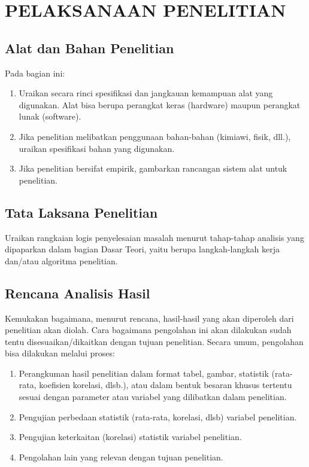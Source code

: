 \chapter{PELAKSANAAN PENELITIAN}
\label{pelaksanaan-penelitian}


\section{Alat dan Bahan Penelitian}


Pada bagian ini:
\begin{enumerate}[label=\alph*)]
\item Uraikan secara rinci spesifikasi dan jangkauan kemampuan alat yang digunakan. Alat
bisa berupa perangkat keras (hardware) maupun perangkat lunak (software).
\item Jika penelitian melibatkan penggunaan bahan-bahan (kimiawi, fisik, dll.), uraikan
spesifikasi bahan yang digunakan.
\item Jika penelitian bersifat empirik, gambarkan rancangan sistem alat untuk penelitian.
\end{enumerate}



\section{Tata Laksana Penelitian}
 Uraikan rangkaian logis penyelesaian masalah menurut tahap-tahap
analisis yang dipaparkan dalam bagian Dasar Teori, yaitu berupa langkah-langkah
kerja dan/atau algoritma penelitian.


\section{Rencana Analisis Hasil}
 Kemukakan bagaimana, menurut rencana, hasil-hasil yang akan
diperoleh dari penelitian akan diolah. Cara bagaimana pengolahan ini akan dilakukan
sudah tentu disesuaikan/dikaitkan dengan tujuan penelitian. Secara umum, pengolahan bisa
dilakukan melalui proses:
\begin{enumerate}[label=\alph*)]
\item Perangkuman hasil penelitian dalam format tabel, gambar, statistik (rata-rata,
koefisien korelasi, dlsb.), atau dalam bentuk besaran khusus tertentu sesuai dengan
parameter atau variabel yang dilibatkan dalam penelitian.
\item Pengujian perbedaan statistik (rata-rata, korelasi, dlsb) variabel penelitian.
\item Pengujian keterkaitan (korelasi) statistik variabel penelitian.
\item Pengolahan lain yang relevan dengan tujuan penelitian.
\end{enumerate}


